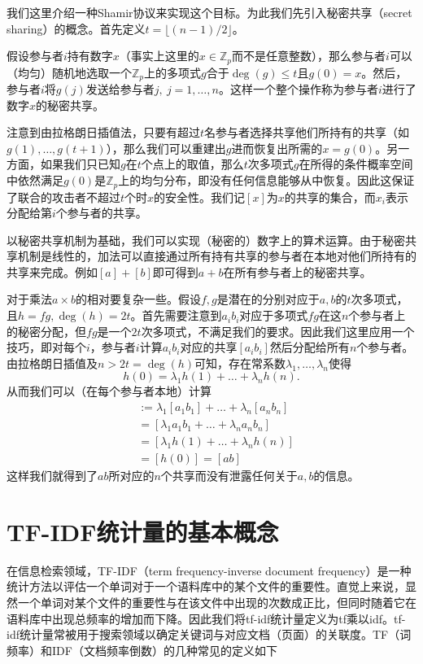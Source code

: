 我们这里介绍一种Shamir协议来实现这个目标。为此我们先引入秘密共享（secret sharing）的概念。首先定义$t=\lfloor(n-1)/2\rfloor$。

假设参与者$i$持有数字$x$（事实上这里的$x\in\mathbb{Z}_p$而不是任意整数），那么参与者$i$可以（均匀）随机地选取一个$\mathbb{Z}_p$上的多项式$g$合于$\deg(g)\leq t$且$g(0)=x$。然后，参与者$i$将$g(j)$发送给参与者$j,\ j=1,\dots,n$。这样一个整个操作称为参与者$i$进行了数字$x$的秘密共享。

注意到由拉格朗日插值法，只要有超过$t$名参与者选择共享他们所持有的共享（如$g(1),\dots,g(t+1)$），那么我们可以重建出$g$进而恢复出所需的$x=g(0)$。另一方面，如果我们只已知$g$在$t$个点上的取值，那么$t$次多项式$g$在所得的条件概率空间中依然满足$g(0)$是$\mathbb{Z}_p$上的均匀分布，即没有任何信息能够从中恢复。因此这保证了联合的攻击者不超过$t$个时$x$的安全性。我们记$[x]$为$x$的共享的集合，而$x_i$表示分配给第$i$个参与者的共享。

以秘密共享机制为基础，我们可以实现（秘密的）数字上的算术运算。由于秘密共享机制是线性的，加法可以直接通过所有持有共享的参与者在本地对他们所持有的共享来完成。例如$[a]+[b]$即可得到$a+b$在所有参与者上的秘密共享。

对于乘法$a\times b$的相对要复杂一些。假设$f,g$是潜在的分别对应于$a,b$的$t$次多项式，且$h=fg,\deg(h)=2t$。首先需要注意到$a_ib_i$对应于多项式$fg$在这$n$个参与者上的秘密分配，但$fg$是一个$2t$次多项式，不满足我们的要求。因此我们这里应用一个技巧，即对每个$i$，参与者$i$计算$a_ib_i$对应的共享$[a_ib_i]$然后分配给所有$n$个参与者。由拉格朗日插值及$n>2t=\deg(h)$可知，存在常系数$\lambda_1,\dots,\lambda_n$使得
\begin{equation}
h(0)=\lambda_1 h(1)+\dots+\lambda_n h(n).
\end{equation}
从而我们可以（在每个参与者本地）计算
\begin{align}
[c] &:= \lambda_1[a_1b_1]+\dots+\lambda_n[a_nb_n]\nonumber\\
&=[\lambda_1a_1b_1+\dots+\lambda_na_nb_n]\nonumber\\
&=[\lambda_1h(1)+\dots+\lambda_n h(n)]\nonumber\\
&=[h(0)]=[ab]
\end{align}
这样我们就得到了$ab$所对应的$n$个共享而没有泄露任何关于$a,b$的信息。

\section{TF-IDF统计量的基本概念}
\label{section: tfidf}

在信息检索领域，TF-IDF（term frequency-inverse document frequency）是一种统计方法以评估一个单词对于一个语料库中的某个文件的重要性。直觉上来说，显然一个单词对某个文件的重要性与在该文件中出现的次数成正比，但同时随着它在语料库中出现总频率的增加而下降。因此我们将tf-idf统计量定义为tf乘以idf。tf-idf统计量常被用于搜索领域以确定关键词与对应文档（页面）的关联度。TF（词频率）和IDF（文档频率倒数）的几种常见的定义如下

